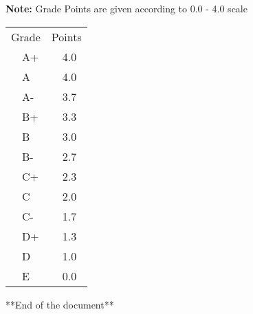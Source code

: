 \documentclass[12pt]{article}
\begin{document}
\textbf{Note:} Grade Points are given according to 0.0 - 4.0 scale

\begin{table}[H]
\centering
\begin{tabular}{ll}
\multicolumn{1}{c}{Grade} &
\multicolumn{1}{c}{Points}\\
\ \ A+    & \ \ 4.0    \\ 
\ \ A     & \ \ 4.0    \\ 
\ \ A-    & \ \ 3.7    \\ 
\ \ B+    & \ \ 3.3    \\ 
\ \ B    & \ \ 3.0    \\ 
\ \ B-    & \ \ 2.7    \\ 
\ \ C+    & \ \ 2.3    \\ 
\ \ C     & \ \ 2.0    \\ 
\ \ C-    & \ \ 1.7    \\ 
\ \ D+    & \ \ 1.3    \\ 
\ \ D     & \ \ 1.0    \\ 
\ \ E     & \ \ 0.0    \\ 
\end{tabular}
\end{table}

\begin{center}
**End of the document**
\end{center}
\end{document}
